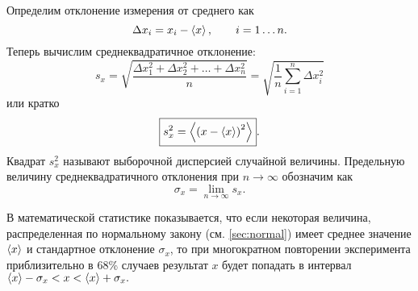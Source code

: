 

Определим отклонение измерения от среднего как
\[
\Delta x_{i}=x_{i}-\left<x\right>,\qquad i=1\ldots n.
\]
Теперь вычислим среднеквадратичное отклонение:
\begin{equation}
    s_{x}=\sqrt{\frac{\Delta x_{1}^{2}+\Delta x_{2}^{2}+\ldots+\Delta x_{n}^{2}}{n}}=\sqrt{\frac{1}{n}\sum\limits _{i=1}^{n}\Delta x_{i}^{2}}\label{eq:sigma}
\end{equation}
или кратко
\begin{equation}
    \boxed{s_{x}^{2}=\left<\left(x-\left<x\right>\right)^{2}\right>}.\label{eq:sigma_s}
\end{equation}
Квадрат $s_{x}^{2}$ называют выборочной дисперсией случайной величины. Предельную величину среднеквадратичного отклонения
при $n\to\infty$ обозначим как
\[
\sigma_{x}=\lim\limits _{n\to\infty}s_{x}.
\]

В математической статистике показывается, что если некоторая величина, распределенная по нормальному закону (см. \ref{sec:normal}) имеет среднее значение $\left<x\right>$ и стандартное отклонение $\sigma_x$, то при многократном повторении эксперимента приблизительно в 68\% случаев результат $x$ будет попадать в интервал $\left<x\right>-\sigma_{x}<x<\left<x\right>+\sigma_{x}.$



